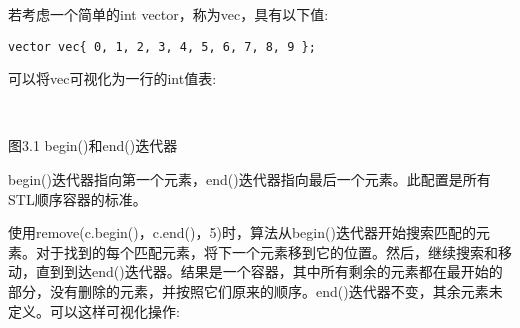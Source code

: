 若考虑一个简单的int vector，称为vec，具有以下值:

\begin{lstlisting}[style=styleCXX]
vector vec{ 0, 1, 2, 3, 4, 5, 6, 7, 8, 9 };
\end{lstlisting}

可以将vec可视化为一行的int值表:

\hspace*{\fill} \\ %
\begin{center}

图3.1  begin()和end()迭代器
\end{center}

begin()迭代器指向第一个元素，end()迭代器指向最后一个元素。此配置是所有STL顺序容器的标准。

使用remove(c.begin()，c.end()，5)时，算法从begin()迭代器开始搜索匹配的元素。对于找到的每个匹配元素，将下一个元素移到它的位置。然后，继续搜索和移动，直到到达end()迭代器。结果是一个容器，其中所有剩余的元素都在最开始的部分，没有删除的元素，并按照它们原来的顺序。end()迭代器不变，其余元素未定义。可以这样可视化操作:

